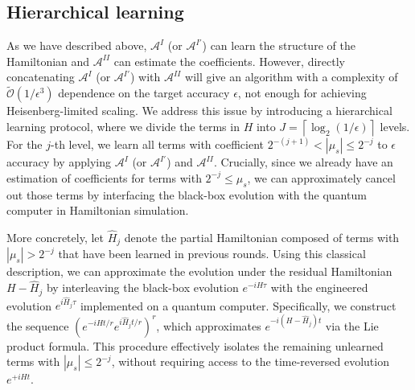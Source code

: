 \documentclass[twocolumn,superscriptaddress,aps,showpacs,amsmath,amstex,amssymb,citeautoscript,floatfix,pra,preprintnumbers]{revtex4-2}
\newcounter{alg}
\theoremstyle{plain}
\theoremstyle{plain}
\theoremstyle{plain}
\theoremstyle{plain}
\theoremstyle{plain}
\theoremstyle{plain}
\begin{document}
\subsection{Hierarchical learning\label{subsec:hierarchy_learning}}
As we have described above, $\mathcal{A}^I$ (or $\mathcal{A}^{I'}$) can learn the structure of the Hamiltonian and $\mathcal{A}^{II}$ can estimate the coefficients. However, directly concatenating $\mathcal{A}^I$ (or $\mathcal{A}^{I'}$) with $\mathcal{A}^{II}$ will give an algorithm with a complexity of $\widetilde{\mathcal{O}}(1/\epsilon^3)$ dependence on the target accuracy $\epsilon$, not enough for achieving Heisenberg-limited scaling. 
We address this issue by introducing a hierarchical learning protocol, where we divide the terms in $H$ into $J=\left\lceil\log_2(1/\epsilon)\right\rceil$ levels. For the $j$-th level, we learn all terms with coefficient $2^{-(j+1)}<|\mu_s|\leq 2^{-j}$ to $\epsilon$ accuracy by applying $\mathcal{A}^I$ (or $\mathcal{A}^{I'}$) and $\mathcal{A}^{II}$. Crucially, since we already have an estimation of coefficients for terms with $2^{-j}\leq\mu_s$, we can approximately cancel out those terms by interfacing the black-box evolution with the quantum computer in Hamiltonian simulation. 

More concretely, let $\hat{H}_j$ denote the partial Hamiltonian composed of terms with $|\mu_s| > 2^{-j}$ that have been learned in previous rounds. Using this classical description, we can approximate the evolution under the residual Hamiltonian $H - \hat{H}_j$ by interleaving the black-box evolution $e^{-iH\tau}$ with the engineered evolution $e^{i\hat{H}_j\tau}$ implemented on a quantum computer. Specifically, we construct the sequence $(e^{-iH t/r} e^{i\hat{H}_j t/r})^r$, which approximates $e^{-i(H - \hat{H}_j)t}$ via the Lie product formula. This procedure effectively isolates the remaining unlearned terms with $|\mu_s| \leq 2^{-j}$, without requiring access to the time-reversed evolution $e^{+iHt}$.
\end{document}
